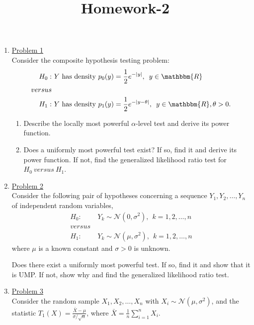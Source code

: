 \documentclass[a4paper,english,12pt]{article}
\title{Homework-2}
\author{}
\begin{document}
\maketitle

\begin{enumerate}
\item \hyperlink{solution1}{Problem 1}\\
Consider the composite hypothesis testing problem:
\begin{align*}
H_0:&~Y~\mbox{has density }p_0(y)=\frac{1}{2}e^{-|y|},\hspace{5pt}y\in \mathbbm{R}\\
versus&\\
H_1:&~Y~\mbox{has density }p_1(y)=\frac{1}{2}e^{-|y-\theta|},\hspace{5pt}y\in \mathbbm{R},\theta>0.
\end{align*}
\begin{enumerate}
\item Describe the locally most powerful $\alpha$-level test and derive its power function.
\item Does a uniformly most powerful test exist? If so, find it and derive its power function. If not, find the generalized likelihood ratio test for $H_0~versus~H_1$.
\end{enumerate}
\item \hyperlink{solution2}{Problem 2}\\
Consider the following pair of hypotheses concerning a sequence $Y_1,Y_2,\dots,Y_n$ of independent random variables,
\begin{align*}
H_0:&~Y_k\sim \mathcal{N}(0,\sigma^2),\hspace{5pt}k=1,2,\dots,n\\
versus&\\
H_1:&~Y_k\sim \mathcal{N}(\mu,\sigma^2),\hspace{5pt}k=1,2,\dots,n
\end{align*}
where $\mu$ is a known constant and $\sigma>0$ is unknown.
\par Does there exist a uniformly most powerful test. If so, find it and show that it is UMP. If not, show why and find the generalized likelihood ratio test.
\item \hyperlink{solution3}{Problem 3}\\
Consider the random sample $X_1,X_2,\dots,X_n$ with $X_i\sim \mathcal{N}(\mu,\sigma^2)$, and the statistic $T_1(X)=\frac{\bar{X}-\mu}{\sigma/\sqrt{n}}$, where  $\bar{X}=\frac{1}{n}\sum\limits_{i=1}^{n} X_i$.
\begin{enumerate}

\end{enumerate}
\end{enumerate}
\end{document}
